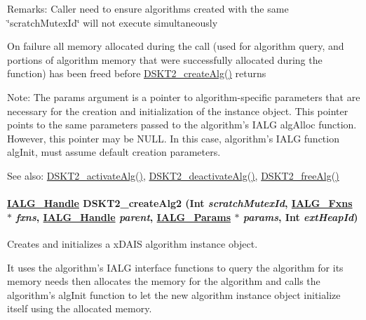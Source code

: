 \begin{Desc}
\item[Remarks:]Caller need to ensure algorithms created with the same \char`\"{}scratch\-Mutex\-Id\char`\"{} will not execute simultaneously

On failure all memory allocated during the call (used for algorithm query, and portions of algorithm memory that were successfully allocated during the function) has been freed before \hyperlink{group___d_s_p_d_s_k_t2_g5528d73c34724bc310404da0dc2fbd69}{DSKT2\_\-create\-Alg()} returns\end{Desc}
\begin{Desc}
\item[Note:]The params argument is a pointer to algorithm-specific parameters that are necessary for the creation and initialization of the instance object. This pointer points to the same parameters passed to the algorithm's IALG alg\-Alloc function. However, this pointer may be NULL. In this case, algorithm's IALG function alg\-Init, must assume default creation parameters.\end{Desc}
\begin{Desc}
\item[See also:]\hyperlink{group___d_s_p_d_s_k_t2_gf946d426d6d9a95040d3967fa746cd7a}{DSKT2\_\-activate\-Alg()}, \hyperlink{group___d_s_p_d_s_k_t2_g74b6b6feca63328906acade37d23b597}{DSKT2\_\-deactivate\-Alg()}, \hyperlink{group___d_s_p_d_s_k_t2_g8dffa02b3ca1ff6856ce3cf610be7435}{DSKT2\_\-free\-Alg()} \end{Desc}
\hypertarget{group___d_s_p_d_s_k_t2_gda6c7f86ed679447cb8f69b0c50a616c}{
\paragraph[DSKT2\_\-createAlg2]{\setlength{\rightskip}{0pt plus 5cm}\hyperlink{struct_i_a_l_g___obj}{IALG\_\-Handle} DSKT2\_\-create\-Alg2 (Int {\em scratch\-Mutex\-Id}, \hyperlink{struct_i_a_l_g___fxns}{IALG\_\-Fxns} $\ast$ {\em fxns}, \hyperlink{struct_i_a_l_g___obj}{IALG\_\-Handle} {\em parent}, \hyperlink{struct_i_a_l_g___params}{IALG\_\-Params} $\ast$ {\em params}, Int {\em ext\-Heap\-Id})}\hfill}
\label{group___d_s_p_d_s_k_t2_gda6c7f86ed679447cb8f69b0c50a616c}


Creates and initializes a x\-DAIS algorithm instance object. 

It uses the algorithm's IALG interface functions to query the algorithm for its memory needs then allocates the memory for the algorithm and calls the algorithm's alg\-Init function to let the new algorithm instance object initialize itself using the allocated memory.

